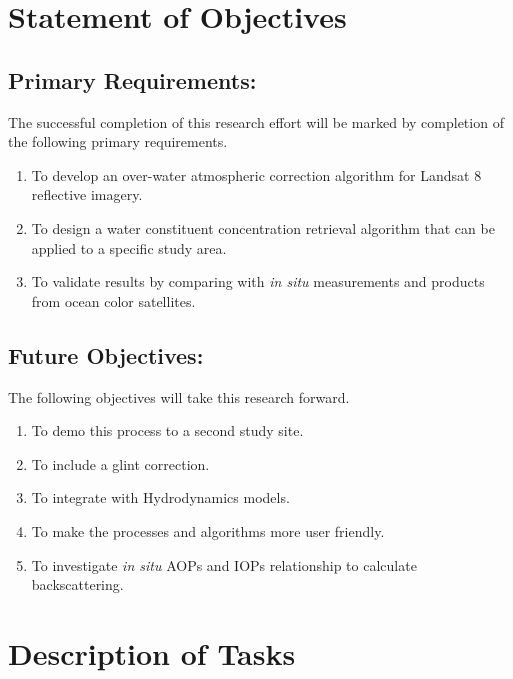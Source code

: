 \section{Statement of Objectives}
\label{sec:objectives}
\subsection{Primary Requirements:}
The successful completion of this research effort will be marked by completion of the following primary requirements.
\begin{enumerate}
	\item To develop an over-water atmospheric correction algorithm for Landsat 8 reflective imagery.
	\item To design a water constituent concentration retrieval algorithm that can be applied to a specific study area.
	\item To validate results by comparing with {\it in situ} measurements and products from ocean color satellites.
\end{enumerate}

\subsection{Future Objectives:}
The following objectives will take this research forward.
\begin{enumerate}
	\item To demo this process to a second study site.
	\item To include a glint correction.
	\item To integrate with Hydrodynamics models.
	\item To make the processes and algorithms more user friendly.
	\item To investigate {\it in situ} AOPs and IOPs relationship to calculate backscattering.
\end{enumerate}
\section{Description of Tasks}
\label{sec:tasks}

